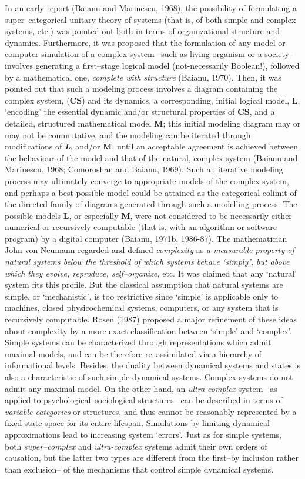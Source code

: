 \documentclass[12pt]{article}
\theoremstyle{plain}
\theoremstyle{definition}
\theoremstyle{plain}
\numberwithin{equation}{section}
\begin{document}
 In an early report (Baianu and Marinescu, 1968), the possibility
of formulating a super--categorical unitary theory of systems
(that is, of both simple and complex systems, etc.) was pointed out both in
terms of organizational structure and dynamics. Furthermore, it
was proposed that the formulation of any model or computer simulation of
a complex system-- such as living organism or a society--involves
generating a first--stage logical model (not-necessarily
Boolean!), followed by a mathematical one, \emph{complete
with structure} (Baianu, 1970). Then, it was pointed out that 
such a modeling process involves a diagram containing 
the complex system, (\textbf{CS}) and its dynamics, a corresponding, initial logical model, \textbf{L}, `encoding' the essential dynamic and/or structural properties of \textbf{CS}, and a detailed, structured mathematical
model $\mathbf{M}$; this initial modeling diagram may or may
not be commutative, and the modeling can be iterated through
modifications of \emph{\textbf{L}}, and/or $\mathbf{M}$, until an
acceptable agreement is achieved between the behaviour of the
model and that of the natural, complex system (Baianu and Marinescu, 1968;
Comoroshan and Baianu, 1969). Such an iterative modeling process 
may ultimately converge to appropriate models of the complex system, 
and perhaps a best possible model could be attained as the categorical 
colimit of the directed family of diagrams generated through such a modelling
process. The possible models $\mathbf{L}$, or especially
$\mathbf{M}$, were not considered to be necessarily either
numerical or recursively computable (that is, with an algorithm or
software program) by a digital computer (Baianu, 1971b, 1986-87).
The mathematician John von Neumann regarded and defined \emph{complexity} as \emph{a
measurable property of natural systems below the threshold of
which systems behave `simply', but above which they evolve,
reproduce, self--organize,} etc. It was claimed that any `natural' system fits this profile. But the classical assumption that natural systems are simple, or `mechanistic', is too restrictive since `simple' is applicable only to machines, closed physicochemical systems, computers, or any system that is recursively computable. Rosen (1987) proposed a major refinement of these ideas about complexity by a more exact classification between `simple' and `complex'. Simple systems can be characterized through representations which admit maximal models, and can be therefore re--assimilated via a hierarchy of informational levels. Besides, the duality between dynamical systems and states is also a characteristic of such simple dynamical systems. Complex systems do not admit any maximal model.  On the other hand, an \emph{ultra-complex} system-- as applied to psychological--sociological structures-- can be described in terms of \emph{variable categories} or structures, and thus cannot be reasonably represented by a fixed state space for its entire lifespan. Simulations by limiting dynamical approximations lead to
increasing system `errors'. Just as for simple systems, both \emph{super--complex} and
\emph{ultra-complex} systems admit their own orders of causation,
but the latter two types are different from the first--by inclusion
rather than exclusion-- of the mechanisms that control simple dynamical
systems.

\end{document}
